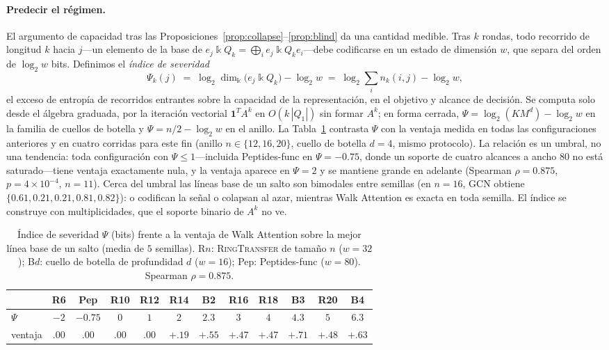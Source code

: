\documentclass[runningheads]{llncs}
\newcommand{\kk}{\Bbbk}
\newcommand{\kQ}{\kk Q}
\newcommand{\Adj}{A}
\begin{document}
\paragraph{Predecir el régimen.}
El argumento de capacidad tras las
Proposiciones~\ref{prop:collapse}--\ref{prop:blind} da una cantidad medible.
Tras $k$ rondas, todo recorrido de longitud $k$ hacia $j$---un elemento de la
base de $e_j\kQ_k=\bigoplus_i e_j\kQ_k e_i$---debe codificarse en un estado de
dimensión $w$, que separa del orden de $\log_2 w$ bits. Definimos el
\emph{índice de severidad}
\begin{equation}\label{eq:psi}
  \Psi_k(j)\;=\;\log_2\dim_\kk\bigl(e_j\kQ_k\bigr)-\log_2 w
  \;=\;\log_2\textstyle\sum_i n_k(i,j)-\log_2 w,
\end{equation}
el exceso de entropía de recorridos entrantes sobre la capacidad de la
representación, en el objetivo y alcance de decisión. Se computa solo desde el
álgebra graduada, por la iteración vectorial $\mathbf{1}^{T}\Adj^{k}$ en
$O(k\,|Q_1|)$ sin formar $\Adj^{k}$; en forma cerrada,
$\Psi=\log_2(KM^{d})-\log_2 w$ en la familia de cuellos de botella y
$\Psi=n/2-\log_2 w$ en el anillo. La Tabla~\ref{tab:severity} contrasta $\Psi$
con la ventaja medida en todas las configuraciones anteriores y en cuatro
corridas para este fin (anillo $n\in\{12,16,20\}$, cuello de botella $d{=}4$,
mismo protocolo). La relación es un umbral, no una tendencia: toda
configuración con $\Psi\le1$---incluida Peptides-func en $\Psi=-0.75$, donde un
soporte de cuatro alcances a ancho $80$ no está saturado---tiene ventaja
exactamente nula, y la ventaja aparece en $\Psi=2$ y se mantiene grande en
adelante (Spearman $\rho=0.875$, $p=4\times10^{-4}$, $n=11$). Cerca del umbral
las líneas base de un salto son bimodales entre semillas (en $n{=}16$, GCN
obtiene $\{0.61,0.21,0.21,0.81,0.82\}$): o codifican la señal o colapsan al
azar, mientras Walk Attention es exacta en toda semilla. El índice se construye
con multiplicidades, que el soporte binario de $\Adj^{k}$ no ve.

\begin{table}[t]
\centering
\caption{Índice de severidad $\Psi$ (bits) frente a la ventaja de Walk
Attention sobre la mejor línea base de un salto (media de $5$ semillas). R$n$:
\textsc{RingTransfer} de tamaño $n$ ($w{=}32$); B$d$: cuello de botella de
profundidad $d$ ($w{=}16$); Pep: Peptides-func ($w{=}80$). Spearman
$\rho=0.875$.}
\label{tab:severity}
\setlength{\tabcolsep}{3.2pt}\footnotesize
\begin{tabular}{l*{11}{c}}
\toprule
 & R6 & Pep & R10 & R12 & R14 & B2 & R16 & R18 & B3 & R20 & B4\\
\midrule
$\Psi$ & $-2$ & $-0.75$ & $0$ & $1$ & $2$ & $2.3$ & $3$ & $4$ & $4.3$ & $5$ & $6.3$\\
ventaja & $.00$ & $.00$ & $.00$ & $.00$ & $+.19$ & $+.55$ & $+.47$ & $+.47$ & $+.71$ & $+.48$ & $+.63$\\
\bottomrule
\end{tabular}
\end{table}
\end{document}
